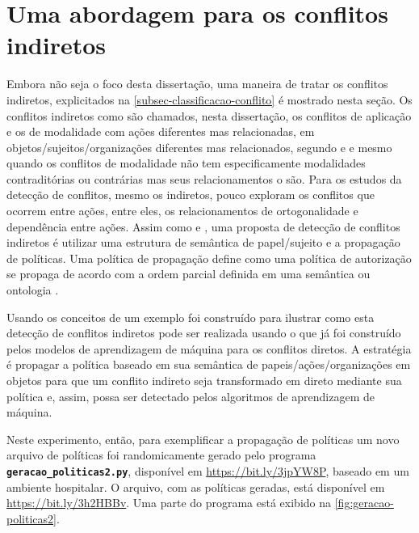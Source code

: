 \section{Uma abordagem para os conflitos indiretos}\label{sec-conflitos-indiretos}
Embora não seja o foco desta dissertação, uma maneira de tratar os conflitos indiretos, explicitados na \autoref{subsec-classificacao-conflito} é mostrado nesta seção. Os conflitos indiretos como são chamados, nesta dissertação, os conflitos de aplicação e os de modalidade com ações diferentes mas relacionadas, em objetos/sujeitos/organizações diferentes mas relacionados, segundo  e  e mesmo quando os conflitos de modalidade não tem especificamente modalidades contraditórias ou contrárias mas seus relacionamentos o são. Para  os estudos da detecção de conflitos, mesmo os indiretos, pouco exploram os conflitos que ocorrem entre ações, entre eles, os relacionamentos de ortogonalidade e dependência entre ações.
Assim como  e , uma proposta de detecção de conflitos indiretos é utilizar uma estrutura de semântica de papel/sujeito e a propagação de políticas. Uma política de propagação define como uma política de autorização se propaga de acordo com a ordem parcial definida em uma semântica ou ontologia \cite[p. 4]{kamoda_policy_2005}.

Usando os conceitos de  um exemplo foi construído para ilustrar como esta detecção de conflitos indiretos pode ser realizada usando o que já foi construído pelos modelos de aprendizagem de máquina para os conflitos diretos. A estratégia é propagar a política baseado em sua semântica de papeis/ações/organizações em objetos para que um conflito indireto seja transformado em direto mediante sua política e, assim, possa ser detectado pelos algoritmos de aprendizagem de máquina.

Neste experimento, então, para exemplificar a propagação de políticas um novo arquivo de políticas foi randomicamente gerado pelo programa \texttt{\textbf{geracao\_politicas2.py}}, disponível em \url{https://bit.ly/3jpYW8P}, baseado em um ambiente hospitalar. O arquivo, com as políticas geradas, está disponível em \url{https://bit.ly/3h2HBBv}. Uma parte do programa está exibido na \autoref{fig:geracao-politicas2}.

